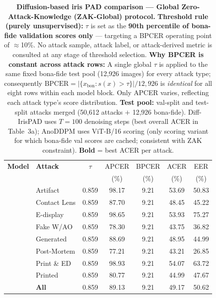 \documentclass{article}
\begin{document}
\begin{table}[!htbp]
\centering
\scriptsize
\setlength{\tabcolsep}{4pt}
\caption{%
  \textbf{Diffusion-based iris PAD comparison — Global Zero-Attack-Knowledge
  (ZAK-Global) protocol.}
  \textbf{Threshold rule (purely unsupervised):}
  $\tau$ is set as the \textbf{90th percentile of bona-fide validation scores
  only} — targeting a BPCER operating point of $\approx$10\%.
  No attack sample, attack label, or attack-derived metric is consulted
  at any stage of threshold selection.
  \textbf{Why BPCER is constant across attack rows:}
  A single global $\tau$ is applied to the same fixed bona-fide test pool
  (12{,}926 images) for every attack type; consequently
  $\text{BPCER}=|\{x_{\text{bon}}:s(x)>\tau\}|/12{,}926$ is
  \emph{identical} for all eight rows within each model block.
  Only APCER varies, reflecting each attack type's score distribution.
  \textbf{Test pool:} val-split and test-split attacks merged
  (50{,}612 attacks $+$ 12{,}926 bona-fide).
  Diff-IrisPAD uses $T{=}100$ denoising steps (best overall ACER in
  Table~3a); AnoDDPM uses ViT-B/16 scoring (only scoring variant for
  which bona-fide val scores are cached; consistent with ZAK constraint).
  \textbf{Bold} = best ACER per attack.}
\label{tab:zak_global}

\begin{tabular}{l l c c c c c}
\toprule
\textbf{Model} & \textbf{Attack} & $\tau$ & APCER & BPCER & ACER & EER \\
               &                 &        & (\%)  & (\%)  & (\%) & (\%) \\
\midrule

& Artifact          & 0.859 &  98.17 &  9.21 &          53.69 &          50.83 \\
& Contact Lens      & 0.859 &  87.70 &  9.21 &          48.45 &          45.22 \\
& E-display         & 0.859 &  98.65 &  9.21 &          53.93 &          75.27 \\
& Fake W/AO         & 0.859 &  78.30 &  9.21 &          43.75 &          36.82 \\
& Generated         & 0.859 &  88.69 &  9.21 &          48.95 &          44.99 \\
& Post-Mortem       & 0.859 &  77.21 &  9.21 &          43.21 &          26.85 \\
& Print \& ED       & 0.859 &  98.93 &  9.21 &          54.07 &          63.72 \\
& Printed           & 0.859 &  80.77 &  9.21 &          44.99 &          47.67 \\
\cmidrule(lr){2-7}
& \textbf{All}      & 0.859 &  89.13 &  9.21 &          49.17 &          50.62 \\
\midrule


\end{tabular}
\end{table}
\end{document}
